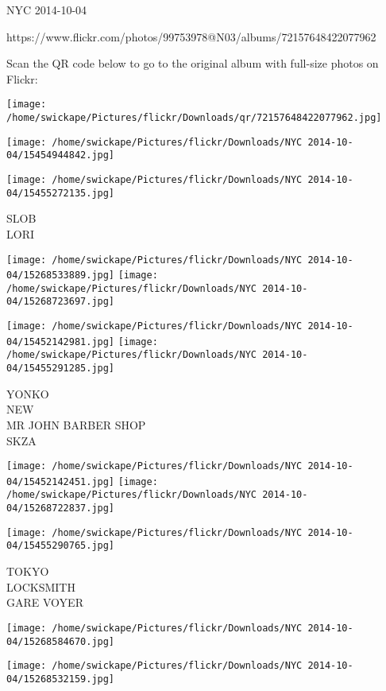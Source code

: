 \documentclass[10pt,letterpaper]{article}
\begin{document}
NYC 2014-10-04

https://www.flickr.com/photos/99753978@N03/albums/72157648422077962

Scan the QR code below to go to the original album with full-size photos on Flickr:

\texttt{[image: /home/swickape/Pictures/flickr/Downloads/qr/72157648422077962.jpg]}
\pagebreak

\texttt{[image: /home/swickape/Pictures/flickr/Downloads/NYC 2014-10-04/15454944842.jpg]}

\vspace{0.25in}
\texttt{[image: /home/swickape/Pictures/flickr/Downloads/NYC 2014-10-04/15455272135.jpg]}

SLOB\\
LORI\\
\pagebreak

\texttt{[image: /home/swickape/Pictures/flickr/Downloads/NYC 2014-10-04/15268533889.jpg]}
\texttt{[image: /home/swickape/Pictures/flickr/Downloads/NYC 2014-10-04/15268723697.jpg]}

\texttt{[image: /home/swickape/Pictures/flickr/Downloads/NYC 2014-10-04/15452142981.jpg]}
\texttt{[image: /home/swickape/Pictures/flickr/Downloads/NYC 2014-10-04/15455291285.jpg]}

YONKO\\
NEW\\
MR JOHN BARBER SHOP\\
SKZA\\
\pagebreak

\texttt{[image: /home/swickape/Pictures/flickr/Downloads/NYC 2014-10-04/15452142451.jpg]}
\texttt{[image: /home/swickape/Pictures/flickr/Downloads/NYC 2014-10-04/15268722837.jpg]}

\texttt{[image: /home/swickape/Pictures/flickr/Downloads/NYC 2014-10-04/15455290765.jpg]}

TOKYO\\
LOCKSMITH\\
GARE VOYER\\
\pagebreak

\texttt{[image: /home/swickape/Pictures/flickr/Downloads/NYC 2014-10-04/15268584670.jpg]}

\vspace{0.25in}
\texttt{[image: /home/swickape/Pictures/flickr/Downloads/NYC 2014-10-04/15268532159.jpg]}
\end{document}
